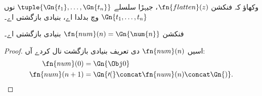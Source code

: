 \documentclass[../../../include/open-logic-section]{subfiles}
\begin{document}
\begin{prob}
وکھاؤ کہ فنکشن $\fn{flatten}(z)$، جیہڑا سلسلے
$\tuple{\Gn{t_1}, \dots, \Gn{t_n}}$ نوں $\Gn{t_1, \dots, t_n}$
وچ بدلدا اے، بنیادی بازگشتی اے۔
\end{prob}

\begin{prop}
  فنکشن $\fn{num}(n) = \Gn{\num{n}}$
  بنیادی بازگشتی اے۔
\end{prop}

\begin{proof}
  اسیں $\fn{num}(n)$ دی تعریف بنیادی بازگشت نال کردے آں:
  \begin{align*}
    \fn{num}(0) & = \Gn{\Obj 0}\\
    \fn{num}(n+1) & = \Gn{\prime(} \concat \fn{num}(n) \concat \Gn{)}.
  \end{align*}
\end{proof}
\end{document}
